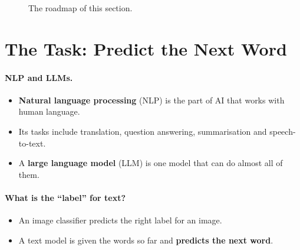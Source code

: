 \documentclass[12pt, a4paper]{article}
\begin{document}
\begin{figure}[H]
  \centering
  \caption{The roadmap of this section.}
  \label{fig:timeline}
\end{figure}

\section{The Task: Predict the Next Word}
\label{sec:task}

\paragraph{NLP and LLMs.}
\begin{itemize}
  \item \textbf{Natural language processing} (NLP) is the part of AI that
        works with human language.
  \item Its tasks include translation, question answering, summarisation and
        speech-to-text.
  \item A \textbf{large language model} (LLM) is one model that can do almost
        all of them.
\end{itemize}

\paragraph{What is the ``label'' for text?}
\begin{itemize}
  \item An image classifier predicts the right label for an image.
  \item A text model is given the words so far and
        \textbf{predicts the next word}.
\end{itemize}
\end{document}
